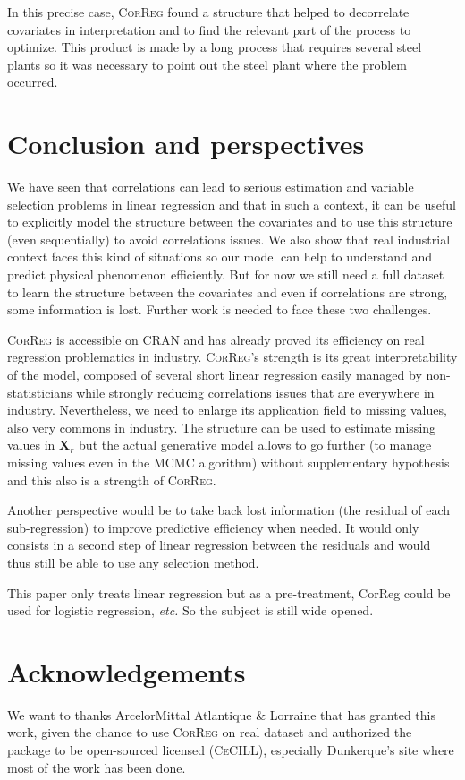 \documentclass[11pt,a4paper]{article}
\begin{document}
In this precise case, \textsc{CorReg} found a structure that helped to decorrelate covariates in interpretation and to find the relevant part of the process to optimize. This product is made by a long process that requires several steel plants so it was necessary to point out the steel plant where the problem occurred.


\section{Conclusion and perspectives} \label{conclusion}
	We have seen that correlations can lead to serious estimation and variable selection problems in linear regression and that in such a context, it can be useful to explicitly model the structure between the covariates and to use this structure (even sequentially) to avoid correlations issues. We also show that real industrial context faces this kind of situations so our model can help to understand and predict physical phenomenon efficiently. But for now we still need a full dataset to learn the structure between the covariates and even if correlations are strong, some information is lost. Further work is needed to face these two challenges.
	
	\textsc{CorReg} is accessible on CRAN and has already proved its efficiency on real regression problematics in industry. \textsc{CorReg}'s strength is its great interpretability of the model, composed of several short linear regression easily managed by non-statisticians while strongly reducing correlations issues that are everywhere in industry.
	Nevertheless, we need to enlarge its application field to missing values, also very commons in industry. The structure can be used to estimate missing values in $\boldsymbol{X}_r$ but the actual generative model allows to go further (to manage missing values even in the MCMC algorithm) without supplementary hypothesis and this also is a strength of \textsc{CorReg}. 
	
	Another perspective would be to take back lost information (the residual of each sub-regression) to improve predictive efficiency when needed. It would only consists in a second step of linear regression between the residuals and would thus still be able to use any selection method.
	
	This paper only treats linear regression but as a pre-treatment, CorReg could be used for logistic regression, {\it etc.}
	So the subject is still wide opened.	

\section{Acknowledgements}
	We want to thanks ArcelorMittal Atlantique \& Lorraine that has granted this work, given the chance to use \textsc{CorReg} on real dataset and authorized the package to be open-sourced licensed (\textsc{CeCILL}), especially Dunkerque's site where most of the work has been done.
{}

\end{document}
